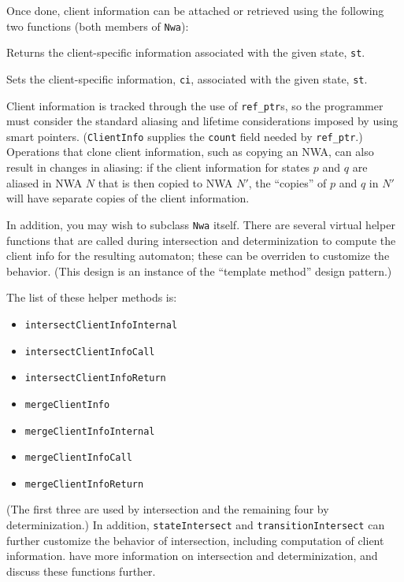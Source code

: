 Once done, client information can be attached or retrieved using the
following two functions (both members of \texttt{Nwa}):
\begin{functionlist}
    Returns the client-specific information associated with
    the given state, \texttt{st}.

    Sets the client-specific information, \texttt{ci},
    associated with the given state, \texttt{st}. \\
\end{functionlist}
Client information is tracked through the use of \texttt{ref\_ptr}s, so the
programmer must consider the standard aliasing and lifetime considerations
imposed by using smart pointers. (\texttt{ClientInfo} supplies the
\texttt{count} field needed by \texttt{ref\_ptr}.) Operations that clone
client information, such as copying
an NWA, can also result in changes in aliasing:
if the client information for states $p$ and $q$ are aliased in NWA $N$ that
is then copied to NWA $N'$, the ``copies'' of $p$ and $q$ in $N'$ will have
separate copies of the client information.

\vspace{\baselineskip}
In addition, you may wish to subclass \texttt{Nwa} itself. There are several
virtual helper functions that are called during intersection and
determinization to compute the client info for the resulting automaton; these
can be overriden to customize the behavior. (This design is an instance
of the ``template method'' design pattern.)

The list of these helper methods is:
\begin{itemize}
  \item \texttt{intersectClientInfoInternal}
  \item \texttt{intersectClientInfoCall}
  \item \texttt{intersectClientInfoReturn}
  \item \texttt{mergeClientInfo}
  \item \texttt{mergeClientInfoInternal}
  \item \texttt{mergeClientInfoCall}
  \item \texttt{mergeClientInfoReturn}
\end{itemize}
(The first three are used by intersection and the remaining four by
determinization.) In addition, \texttt{stateIntersect} and
\texttt{transitionIntersect} can further customize the behavior of
intersection, including computation of client
information.  have more information on
intersection and determinization, and discuss these functions further.


